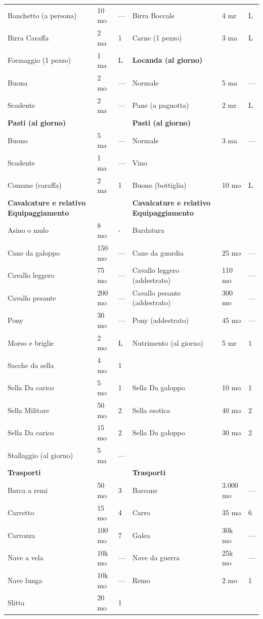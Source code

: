\documentclass[a4paper,11pt,twoside,openany]{book}
\begin{document}
\begin{tabularx}{\textwidth}{XllXll}
	Banchetto (a persona)   & 10 mo    & —& Birra Boccale& 4 mr& L\\
	Birra Caraffa& 2 ma& 1& Carne (1 pezzo)   & 3 ma& L\\
	Formaggio (1 pezzo)& 1 ma& L& \textbf{Locanda (al giorno)}  && \\
	Buona & 2 mo& —& Normale& 5 ma& —\\
	Scadente    & 2 ma& —& Pane (a pagnotta) & 2 mr& L\\
	\textbf{Pasti (al giorno)}    &    & & \textbf{Pasti (al giorno)}    && \\
	Buono & 5 ma& —& Normale& 3 ma& —\\
	Scadente    & 1 ma& —& Vino  && \\
	Comune (caraffa)  & 2 ma& 1& Buono (bottiglia) & 10 mo& L\\
	\textbf{Cavalcature e relativo Equipaggiamento} &    & & \textbf{Cavalcature e relativo Equipaggiamento} && \\
	Asino o mulo& 8 mo& -& Bardatura   && \\
	Cane da galoppo   & 150 mo   & —& Cane da guardia   & 25 mo& —\\
	Cavallo leggero   & 75 mo    & —& Cavallo leggero (addestrato)  & 110 mo    & —\\
	Cavallo pesante   & 200 mo   & —& Cavallo pesante (addestrato)  & 300 mo    & —\\
	Pony  & 30 mo    & —& Pony (addestrato) & 45 mo& —\\
	Morso e briglie   & 2 mo& L& Nutrimento (al giorno)  & 5 mr& 1\\
	Sacche da sella   & 4 mo& 1& && \\
	Sella Da carico   & 5 mo& 1& Sella Da galoppo  & 10 mo& 1\\
	Sella Militare    & 50 mo    & 2& Sella esotica& 40 mo& 2\\
	Sella Da carico   & 15 mo    & 2& Sella Da galoppo  & 30 mo& 2\\
	Stallaggio (al giorno)  & 5 ma& —& && \\
	\textbf{Trasporti}&    & & \textbf{Trasporti}&& \\
	Barca a remi& 50 mo    & 3& Barcone& 3.000 mo  & —\\
	Carretto    & 15 mo    & 4& Carro & 35 mo& 6\\
	Carrozza    & 100 mo   & 7& Galea & 30k mo    & —\\
	Nave a vela & 10k mo   & —& Nave da guerra    & 25k mo    & —\\
	Nave lunga  & 10k mo   & —& Remo  & 2 mo& 1\\
	Slitta& 20 mo    & 1& && \\
\end{tabularx}
\bigskip
\end{document}
